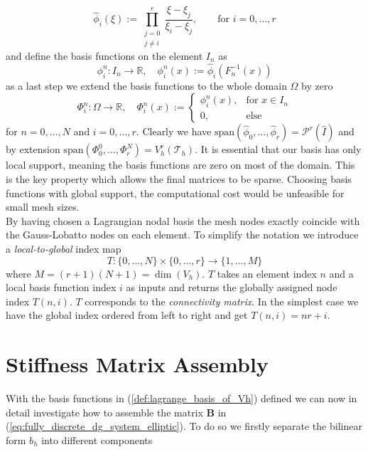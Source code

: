 \begin{equation}
	\label{def:lagrange_ref_basis}
	\widehat{\phi}_i(\xi) := \prod_{\substack{j = 0 \\ j\neq i}}^{r}\frac{\xi - \xi_j}{\xi_i - \xi_j},
	\qquad \text{for } i=0,\ldots,r
\end{equation}
and define the basis functions on the element $I_n$ as
\begin{equation}
	\phi^n_i : I_n \to \mathbb{R}, \quad \phi^n_i(x) := \widehat{\phi}_i(F_n^{-1}(x))
	\nonumber
\end{equation}
as a last step we extend the basis functions to the whole domain $\Omega$ by zero
\begin{equation}
	\Phi_i^n: \Omega \to \mathbb{R}, \quad \Phi_i^n(x) :=
	\begin{cases}
		\phi_i^n(x), & \text{for } x\in I_n \\
		0,           & \text{else}
	\end{cases}
	\label{def:lagrange_basis_of_Vh}
\end{equation}
for $n=0,\ldots,N$ and $i=0,\ldots,r$. Clearly we have $\text{span}( \widehat{\phi}_0, \ldots, \widehat{\phi}_r) = \mathcal{P}^r(\hat{I})$
and by extension $\text{span}(\Phi_0^0,\ldots,\Phi_r^N) = V_h^r(\mathcal{T}_h)$. It is essential
that our basis has only local support, meaning the basis functions are zero on most of the domain. This is the key property which
allows the final matrices to be sparse. Choosing basis functions with global support, the computational cost would be unfeasible for
small mesh sizes. \\
By having chosen a Lagrangian nodal basis the mesh nodes exactly coincide with the Gauss-Lobatto nodes on each
element.
To simplify the notation we introduce a \textit{local-to-global} index map
\begin{equation}
	\label{def:local_to_global_map}
	T: \{0,\ldots,N\} \times \{0,\ldots,r\} \to \{1,\ldots,M\}
\end{equation}
where $M = (r+1)(N+1) = \dim(V_h)$. $T$ takes an element index $n$ and a local basis function index $i$ as inputs
and returns the globally assigned node index $T(n,i)$. $T$ corresponds to the
\textit{connectivity matrix}. In the simplest case we have the global index ordered from left to right and get
$T(n,i) = nr + i$.

\section{Stiffness Matrix Assembly}
\label{sec:stiff_assembly}
With the basis functions in (\ref{def:lagrange_basis_of_Vh}) defined we can now in detail investigate how
to assemble the matrix $\textbf{B}$ in (\ref{eq:fully_discrete_dg_system_elliptic}). To do so we firstly separate
the bilinear form $b_h$ into different components

